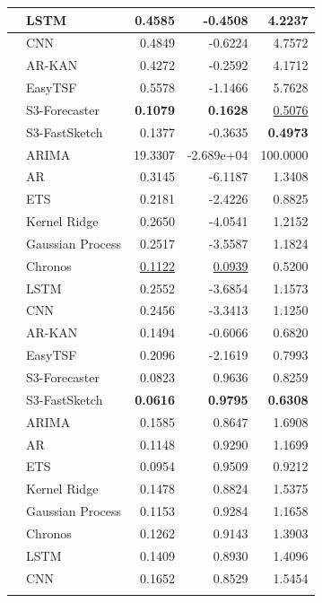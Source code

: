 \begin{table}[p]
\begin{tabular}{|>{\centering\arraybackslash}p{1.55cm}|>{\raggedright\arraybackslash}p{2.85cm}|r|r|r|}
\cline{2-5}
 & LSTM & 0.4585 & -0.4508 & 4.2237 \\
\cline{2-5}
 & CNN & 0.4849 & -0.6224 & 4.7572 \\
\cline{2-5}
 & AR-KAN & 0.4272 & -0.2592 & 4.1712 \\
\cline{2-5}
 & EasyTSF & 0.5578 & -1.1466 & 5.7628 \\
\hline
\multirow{12}{=}{\centering ICMD} & S3-Forecaster & \textbf{0.1079} & \textbf{0.1628} & \underline{0.5076} \\
\cline{2-5}
 & S3-FastSketch & 0.1377 & -0.3635 & \textbf{0.4973} \\
\cline{2-5}
 & ARIMA & 19.3307 & -2.689e+04 & 100.0000 \\
\cline{2-5}
 & AR & 0.3145 & -6.1187 & 1.3408 \\
\cline{2-5}
 & ETS & 0.2181 & -2.4226 & 0.8825 \\
\cline{2-5}
 & Kernel Ridge & 0.2650 & -4.0541 & 1.2152 \\
\cline{2-5}
 & Gaussian Process & 0.2517 & -3.5587 & 1.1824 \\
\cline{2-5}
 & Chronos & \underline{0.1122} & \underline{0.0939} & 0.5200 \\
\cline{2-5}
 & LSTM & 0.2552 & -3.6854 & 1.1573 \\
\cline{2-5}
 & CNN & 0.2456 & -3.3413 & 1.1250 \\
\cline{2-5}
 & AR-KAN & 0.1494 & -0.6066 & 0.6820 \\
\cline{2-5}
 & EasyTSF & 0.2096 & -2.1619 & 0.7993 \\
\hline
\multirow{12}{=}{\centering Tourism} & S3-Forecaster & 0.0823 & 0.9636 & 0.8259 \\
\cline{2-5}
 & S3-FastSketch & \textbf{0.0616} & \textbf{0.9795} & \textbf{0.6308} \\
\cline{2-5}
 & ARIMA & 0.1585 & 0.8647 & 1.6908 \\
\cline{2-5}
 & AR & 0.1148 & 0.9290 & 1.1699 \\
\cline{2-5}
 & ETS & 0.0954 & 0.9509 & 0.9212 \\
\cline{2-5}
 & Kernel Ridge & 0.1478 & 0.8824 & 1.5375 \\
\cline{2-5}
 & Gaussian Process & 0.1153 & 0.9284 & 1.1658 \\
\cline{2-5}
 & Chronos & 0.1262 & 0.9143 & 1.3903 \\
\cline{2-5}
 & LSTM & 0.1409 & 0.8930 & 1.4096 \\
\cline{2-5}
 & CNN & 0.1652 & 0.8529 & 1.5454 \\
\cline{2-5}

\end{tabular}
\end{table}
